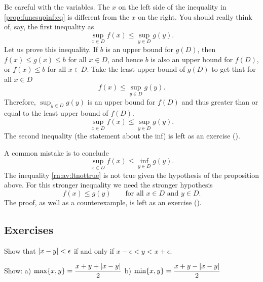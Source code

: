 Be careful with the variables.  The $x$ on the left side of
the inequality in \eqref{prop:funcsupinf:eq}
is different from the $x$ on the right.  You
should really think of, say, the first inequality as
\begin{equation*}
\sup_{x \in D} f(x) \leq \sup_{y \in D} g(y) .
\end{equation*}
Let us prove this inequality.  If $b$ is an upper bound for $g(D)$, then
$f(x) \leq g(x) \leq b$ for all $x \in D$, and hence $b$ is also an upper
bound for $f(D)$,
or $f(x) \leq b$ for all $x \in D$.
Take the least upper bound of $g(D)$ to get that for all $x \in D$
\begin{equation*}
f(x) \leq \sup_{y \in D} g(y) .
\end{equation*}
Therefore,
$\sup_{y \in D} g(y)$ is an upper bound for $f(D)$ and thus greater than or
equal to the least upper bound of $f(D)$.
\begin{equation*}
\sup_{x \in D} f(x) \leq \sup_{y \in D} g(y) .
\end{equation*}
The second inequality (the statement about the inf) is left as an exercise
().

\medskip

A common mistake is to conclude
\begin{equation} \label{rn:av:ltnottrue}
\sup_{x \in D} f(x) \leq \inf_{y \in D} g(y) .
\end{equation}
The inequality \eqref{rn:av:ltnottrue} is not true given the hypothesis of
the proposition above.  For this stronger
inequality we need the stronger hypothesis
\begin{equation*}
f(x) \leq g(y) \qquad \text{for all } x \in D \text{ and } y \in D.
\end{equation*}
The proof, as well as a counterexample, is left as an exercise
().

\subsection{Exercises}

\begin{exercise}
Show that
$\lvert {x-y} \rvert < \epsilon$ if and only if $x-\epsilon < y < x+\epsilon$.
\end{exercise}

\begin{exercise}
Show: \qquad
a)
$\max \{x,y\} = \dfrac{x+y+\lvert {x-y} \rvert}{2}$
\qquad
b)
$\min \{x,y\} = \dfrac{x+y-\lvert {x-y} \rvert}{2}$
\end{exercise}

